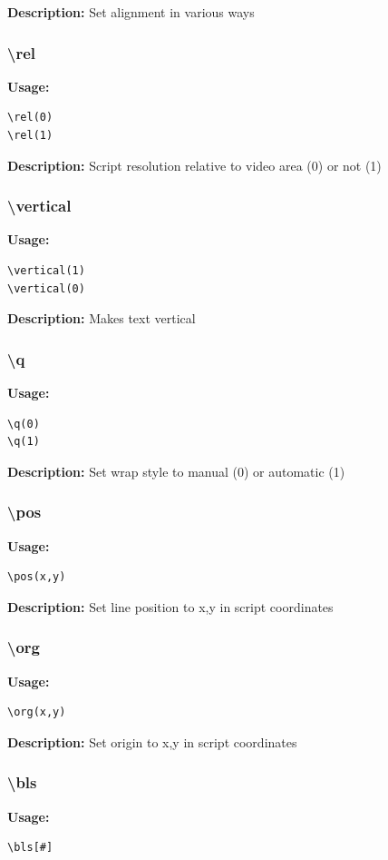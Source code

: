 \documentclass{spec}
\begin{document}
\textbf{Description:}
Set alignment in various ways

\subsubsection{\textbackslash rel}
\textbf{Usage:}
\begin{verbatim}
\rel(0)
\rel(1)
\end{verbatim}

\textbf{Description:}
Script resolution relative to video area (0) or not (1)

\subsubsection{\textbackslash vertical}
\textbf{Usage:}
\begin{verbatim}
\vertical(1)
\vertical(0)
\end{verbatim}

\textbf{Description:}
Makes text vertical

\subsubsection{\textbackslash q}
\textbf{Usage:}
\begin{verbatim}
\q(0)
\q(1)
\end{verbatim}

\textbf{Description:}
Set wrap style to manual (0) or automatic (1)

\subsubsection{\textbackslash pos}
\textbf{Usage:}
\begin{verbatim}
\pos(x,y)
\end{verbatim}

\textbf{Description:}
Set line position to x,y in script coordinates

\subsubsection{\textbackslash org}
\textbf{Usage:}
\begin{verbatim}
\org(x,y)
\end{verbatim}

\textbf{Description:}
Set origin to x,y in script coordinates

\subsubsection{\textbackslash bls}
\textbf{Usage:}
\begin{verbatim}
\bls[#]
\end{verbatim}
\end{document}
